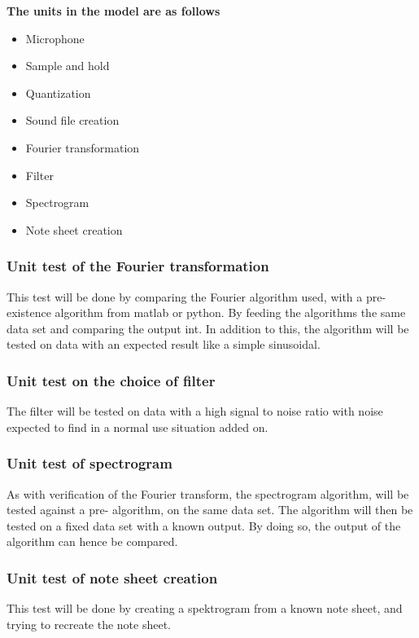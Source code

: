 \textbf{The  units in the model are as follows }
\begin{itemize}
	\item Microphone
	\item Sample and hold
	\item Quantization
	\item Sound file creation
	\item Fourier transformation
	\item Filter
	\item Spectrogram
	\item Note sheet creation
\end{itemize}


\subsubsection{Unit test of the Fourier transformation}
This test will be done by comparing the Fourier algorithm used, with a pre-existence algorithm from matlab or python.
By feeding the algorithms the same data set and comparing the output int. 
In addition to this, the algorithm will be tested on data with an expected result like a simple sinusoidal.
\subsubsection{Unit test on the choice of filter}
The filter will be tested on data with a high signal to noise ratio with noise expected to find in a normal use situation added on.
\subsubsection{Unit test of spectrogram}
As with verification of the Fourier transform, the spectrogram algorithm, will be tested against a pre- algorithm, on the same data set.
The algorithm will then be tested on a fixed data set with a known output.
By doing so, the output of the algorithm can hence be compared.
\subsubsection{Unit test of note sheet creation}
This test will be done by creating a spektrogram from a known note sheet, and trying to recreate the note sheet.

